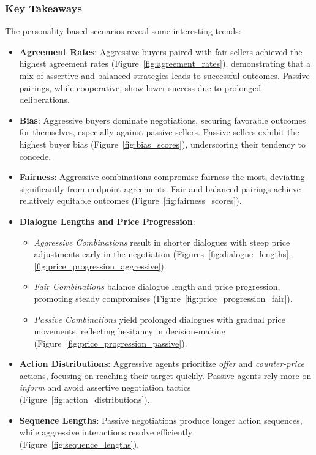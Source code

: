 \documentclass[11pt]{article}
\begin{document}
\subsubsection{Key Takeaways}
The personality-based scenarios reveal some interesting trends:

\begin{itemize}
    \item \textbf{Agreement Rates}: Aggressive buyers paired with fair sellers achieved the highest agreement rates (Figure~\ref{fig:agreement_rates}), demonstrating that a mix of assertive and balanced strategies leads to successful outcomes. Passive pairings, while cooperative, show lower success due to prolonged deliberations.

    \item \textbf{Bias}: Aggressive buyers dominate negotiations, securing favorable outcomes for themselves, especially against passive sellers. Passive sellers exhibit the highest buyer bias (Figure~\ref{fig:bias_scores}), underscoring their tendency to concede.

    \item \textbf{Fairness}: Aggressive combinations compromise fairness the most, deviating significantly from midpoint agreements. Fair and balanced pairings achieve relatively equitable outcomes (Figure~\ref{fig:fairness_scores}).

    \item \textbf{Dialogue Lengths and Price Progression}: 
    \begin{itemize}
        \item \textit{Aggressive Combinations} result in shorter dialogues with steep price adjustments early in the negotiation (Figures~\ref{fig:dialogue_lengths}, \ref{fig:price_progression_aggressive}).
        \item \textit{Fair Combinations} balance dialogue length and price progression, promoting steady compromises (Figure~\ref{fig:price_progression_fair}).
        \item \textit{Passive Combinations} yield prolonged dialogues with gradual price movements, reflecting hesitancy in decision-making (Figure~\ref{fig:price_progression_passive}).
    \end{itemize}

    \item \textbf{Action Distributions}: Aggressive agents prioritize \textit{offer} and \textit{counter-price} actions, focusing on reaching their target quickly. Passive agents rely more on \textit{inform} and avoid assertive negotiation tactics (Figure~\ref{fig:action_distributions}).

    \item \textbf{Sequence Lengths}: Passive negotiations produce longer action sequences, while aggressive interactions resolve efficiently (Figure~\ref{fig:sequence_lengths}).
\end{itemize}
\end{document}
